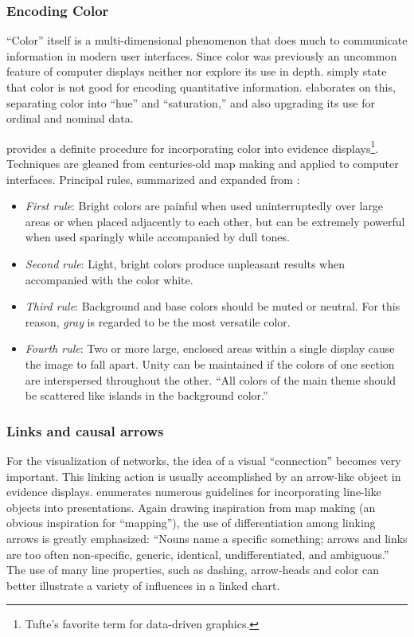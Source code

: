 	\subsubsection{Encoding Color}

``Color'' itself is a multi-dimensional phenomenon that does much to communicate information in modern user interfaces. Since color was previously an uncommon feature of computer displays neither  nor  explore its use in depth.  simply state that color is not good for encoding quantitative information.  elaborates on this, separating color into ``hue'' and ``saturation,'' and also upgrading its use for ordinal and nominal data. 

 provides a definite procedure for incorporating color into evidence displays\footnote{Tufte's favorite term for data-driven graphics.}. Techniques are gleaned from centuries-old map making and applied to computer interfaces. Principal rules, summarized and expanded from :

	\begin{itemize}
		\item \emph{First rule}: Bright colors are painful when used uninterruptedly over large areas or when placed adjacently to each other, but can be extremely powerful when used sparingly while accompanied by dull tones.
		\item \emph{Second rule}: Light, bright colors produce unpleasant results when accompanied with the color white.
		\item \emph{Third rule}: Background and base colors should be muted or neutral. For this reason, \emph{gray} is regarded to be the most versatile color.
		\item \emph{Fourth rule}: Two or more large, enclosed areas within a single display cause the image to fall apart. Unity can be maintained if the colors of one section are interspersed throughout the other. ``All colors of the main theme should be scattered like islands in the background color.''
	\end{itemize}

	\subsubsection{Links and causal arrows}

For the visualization of networks, the idea of a visual ``connection'' becomes very important. This linking action is usually accomplished by an arrow-like object in evidence displays.  enumerates numerous guidelines for incorporating line-like objects into presentations. Again drawing inspiration from map making (an obvious inspiration for ``mapping''), the use of differentiation among linking arrows is greatly emphasized: ``Nouns name a specific something; arrows and links are too often non-specific, generic, identical, undifferentiated, and ambiguous.'' The use of many line properties, such as dashing, arrow-heads and color can better illustrate a variety of influences in a linked chart.

